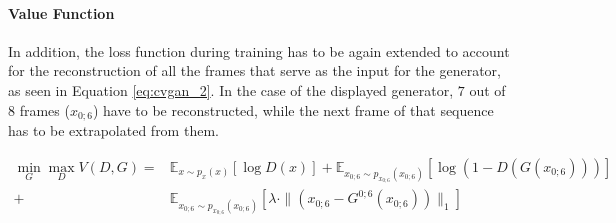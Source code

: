 \paragraph{Value Function} \label{par:vgan_mod_2_vfn}
In addition, the loss function during training has to be again extended to account for the reconstruction of all the frames that serve as the input for the generator, as seen in Equation \ref{eq:cvgan_2}. In the case of the displayed generator, $7$ out of $8$ frames ($x_{0;6}$) have to be reconstructed, while the next frame of that sequence has to be extrapolated from them.

\begin{equation} \label{eq:cvgan_2}
\begin{aligned}
\min_G \max_D V(D,G) = & \mathbb{E}_{x \sim p_x(x)}[\log D(x)] + \mathbb{E}_{x_{0;6} \sim p_{x_{0;6}}(x_{0;6})}[\log(1 - D(G(x_{0;6})))] \\
+ & \mathbb{E}_{x_{0;6} \sim p_{x_{0;6}}(x_{0;6})}[\lambda \cdot \|(x_{0;6} - G^{0;6}(x_{0;6}))\|_1]
\end{aligned}
\end{equation}

